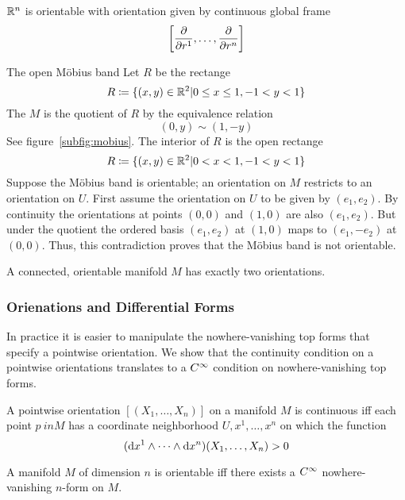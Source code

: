 \begin{example}{}{}
    \(\mathbb{R}^n\) is orientable with orientation given by continuous global frame 
    \[
        \left[ \pdv{}{r^1}, \dots, \pdv{}{r^n} \right]    
    \]
\end{example}
\begin{example}{The open M{\"o}bius band}{}
    Let \(R\) be the rectange 
    \[
        R \coloneqq \{ (x,y)\in \mathbb{R}^2 | 0 \leq x \leq 1, -1 < y < 1 \}    
    \]
    The  \(M\) is the quotient of \(R\) by the equivalence relation 
    \[
        (0, y) \sim (1, -y)
    \]
    See figure~\ref{subfig:mobius}.
    The interior of \(R\) is the open rectange
    \[
        R \coloneqq \{ (x,y)\in \mathbb{R}^2 | 0 < x < 1, -1 < y < 1 \}    
    \]
    Suppose the M{\"o}bius band is orientable; an orientation on \(M\) restricts to an orientation on \(U\).
    First assume the orientation on \(U\) to be given by \((e_1, e_2)\).
    By continuity the orientations at points \((0, 0)\) and \((1,0)\) are also \((e_1, e_2)\).
    But under the quotient the ordered basis \((e_1, e_2)\) at \((1,0)\) maps to \((e_1, -e_2)\) at \((0,0)\).
    Thus, this contradiction proves that the M{\"o}bius band is not orientable.
\end{example}
\begin{proposition}{}{}
    A connected, orientable manifold \(M\) has exactly two orientations.
\end{proposition}

\subsubsection{Orienations and Differential Forms}

In practice it is easier to manipulate the nowhere-vanishing top forms that specify a pointwise orientation.
We show that the continuity condition on a pointwise orientations translates to a \(C^\infty\) condition on nowhere-vanishing top forms.

\begin{lemma}{}{}
    A pointwise orientation \(\left[(X_1, \dots, X_n)\right]\) on a manifold \(M\) is continuous iff each point \(p \ in M\) has a coordinate neighborhood \(U, x^1, \dots, x^n\) on which the function 
    \[
        (\dif x^1 \wedge \cdots \wedge \dif x^n)(X_1, \dots, X_n) > 0   
    \]
\end{lemma}
\begin{theorem}{ }{}
    A manifold \(M\) of dimension \(n\) is orientable iff there exists a \(C^\infty\) nowhere-vanishing \(n\)-form on \(M\).
\end{theorem}


